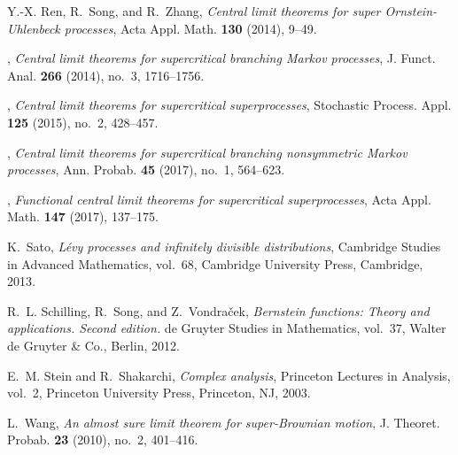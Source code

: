 \documentclass[12pt,a4paper]{amsart}
\theoremstyle{plain}
\theoremstyle{definition}
\numberwithin{equation}{section}
\begin{document}
\begin{thebibliography}{10}
Y.-X. Ren, R.~Song, and R.~Zhang, \emph{Central limit theorems for super
  {O}rnstein-{U}hlenbeck processes}, Acta Appl. Math. \textbf{130} (2014),
  9--49.

\bysame, \emph{Central limit theorems for supercritical branching {M}arkov
  processes}, J. Funct. Anal. \textbf{266} (2014), no.~3, 1716--1756.

\bysame, \emph{Central limit theorems for supercritical superprocesses},
  Stochastic Process. Appl. \textbf{125} (2015), no.~2, 428--457.

\bysame, \emph{Central limit theorems for supercritical branching nonsymmetric
  {M}arkov processes}, Ann. Probab. \textbf{45} (2017), no.~1, 564--623.

\bysame, \emph{Functional central limit theorems for supercritical
  superprocesses}, Acta Appl. Math. \textbf{147} (2017), 137--175.

K.~Sato, \emph{L{\'e}vy processes and infinitely divisible distributions},
  Cambridge Studies in Advanced Mathematics, vol.~68, Cambridge University
  Press, Cambridge, 2013.

R.~L. Schilling, R.~Song, and Z.~Vondra\v{c}ek,
\emph{Bernstein functions: Theory and applications. Second edition.}
de  Gruyter Studies in Mathematics, vol.~37, Walter de Gruyter \& Co., Berlin,
  2012.

E.~M. Stein and R.~Shakarchi, \emph{Complex analysis}, Princeton Lectures in
  Analysis, vol.~2, Princeton University Press, Princeton, NJ, 2003.

L.~Wang, \emph{An almost sure limit theorem for super-{B}rownian motion}, J.
  Theoret. Probab. \textbf{23} (2010), no.~2, 401--416.


\end{thebibliography}
\end{document}
